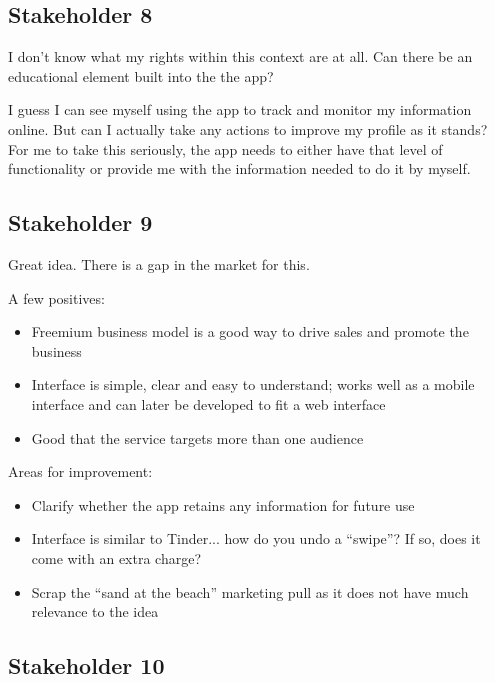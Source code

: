   \subsection{Stakeholder 8}
	
	I don't know what my rights within this context are at all. Can there be an educational element built into the the app? 
	
	I guess I can see myself using the app to track and monitor my information online. But can I actually take any actions to improve my profile as it stands? For me to take this seriously, the app needs to either have that level of functionality or provide me with the information needed to do it by myself.
	
	\subsection{Stakeholder 9}
	
	Great idea. There is a gap in the market for this.
	
	A few positives:
      \begin{itemize}
        \item Freemium business model is a good way to drive sales and promote the business
        \item Interface is simple, clear and easy to understand; works well as a mobile interface and can later be developed to fit a web interface
        \item Good that the service targets more than one audience
      \end{itemize}
	
	Areas for improvement:
      \begin{itemize}
        \item Clarify whether the app retains any information for future use
        \item Interface is similar to Tinder... how do you undo a "`swipe"'? If so, does it come with an extra charge?
        \item Scrap the "`sand at the beach"' marketing pull as it does not have much relevance to the idea
      \end{itemize}
		
		\subsection{Stakeholder 10}
	

